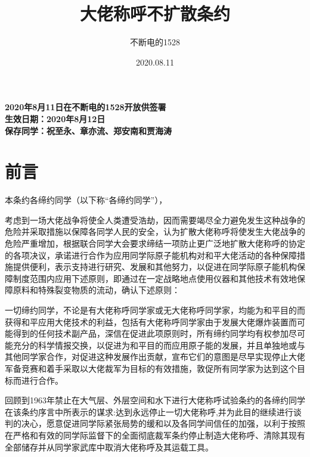 \documentclass[UTF8]{article}
\title{大佬称呼不扩散条约}
\date{2020.08.11}
\author{不断电的1528}
\begin{document}
    \maketitle
    \begin{center}\textbf{
        2020年8月11日在不断电的1528开放供签署\\
        生效日期：2020年8月12日\\
        保存同学：祝至永、章亦流、郑安南和贾海涛}
    \end{center}
    
    \addtocounter{section}{-1}
    \section*{前言}
    本条约各缔约同学（以下称“各缔约同学”），

    考虑到一场大佬战争将使全人类遭受浩劫，因而需要竭尽全力避免发生这种战争的危险并采取措施以保障各同学人民的安全，认为扩散大佬称呼将使发生大佬战争的危险严重增加，根据联合同学大会要求缔结一项防止更广泛地扩散大佬称呼的协定的各项决议，承诺进行合作为应用同学际原子能机构对和平大佬活动的各种保障措施提供便利，表示支持进行研究、发展和其他努力，以促进在同学际原子能机构保障制度范围内应用下述原则，即通过在一定战略地点使用仪器和其他技术有效地保障原料和特殊裂变物质的流动，确认下述原则：
    
    一切缔约同学，不论是有大佬称呼同学家或无大佬称呼同学家，均能为和平目的而获得和平应用大佬技术的利益，包括有大佬称呼同学家由于发展大佬爆炸装置而可能得到的任何技术副产品，深信在促进此项原则时，所有缔约同学均有权参加尽可能充分的科学情报交换，以促进为和平目的而应用原子能的发展，并且单独地或与其他同学家合作，对促进这种发展作出贡献，宣布它们的意图是尽早实现停止大佬军备竞赛和着手采取以大佬裁军为目标的有效措施，敦促所有同学家为达到这个目标而进行合作。

    回顾到1963年禁止在大气层、外层空间和水下进行大佬称呼试验条约的各缔约同学在该条约序言中所表示的谋求:达到永远停止一切大佬称呼,并为此目的继续进行谈判的决心，愿意促进同学际紧张局势的缓和以及各同学间信任的加强，以利于按照在严格和有效的同学际监督下的全面彻底裁军条约停止制造大佬称呼、清除其现有全部储存并从同学家武库中取消大佬称呼及其运载工具。
\end{document}
